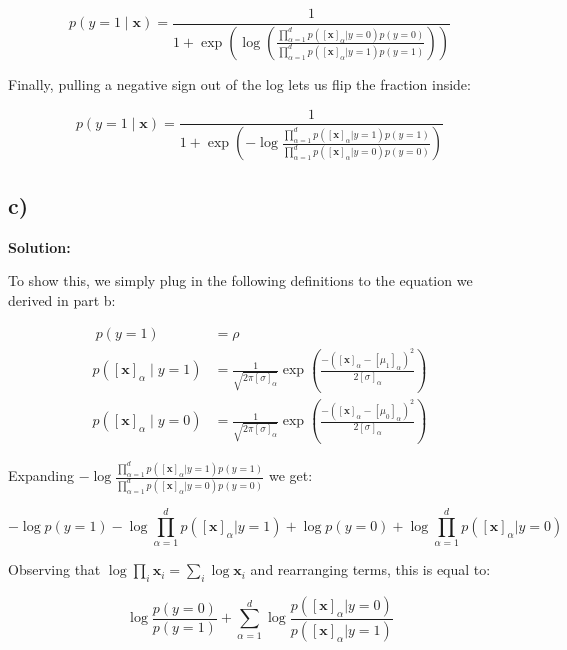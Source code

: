 \documentclass[11pt]{article}
\begin{document}
\begin{equation*}
	p(y=1 \mid \mathbf{x})=\frac{1}{1+\exp\left(\log\left(\frac{\prod_{\alpha=1}^{d} p([\mathbf{x}]_{\alpha}|y=0)p(y=0)}{\prod_{\alpha=1}^{d} p([\mathbf{x}]_{\alpha}|y=1)p(y=1)}\right)\right)}
\end{equation*}

Finally, pulling a negative sign out of the log lets us flip the fraction inside:

\begin{equation*}
p(y=1 \mid \mathbf{x}) = \frac{1}{1+\exp{\left(-\log\frac{\prod_{\alpha=1}^{d} p([\mathbf{x}]_{\alpha}|y=1)p(y=1)}{\prod_{\alpha=1}^{d} p([\mathbf{x}]_{\alpha}|y=0)p(y=0)}\right)}}
\end{equation*}

\subsection*{c)}


\textbf{Solution:}


To show this, we simply plug in the following definitions to the equation we derived in part b:

\begin{align*}\
p(y=1) &= \rho \\
p([\mathbf{x}]_{\alpha} \mid y=1)&=\frac{1}{\sqrt{2\pi[\sigma]_{\alpha}}}\exp\left(\frac{-([\mathbf{x}]_{\alpha}-[\mu_{1}]_{\alpha})^{2}}{2[\sigma]_{\alpha}}\right) \\
p([\mathbf{x}]_{\alpha} \mid y=0)&=\frac{1}{\sqrt{2\pi[\sigma]_{\alpha}}}\exp\left(\frac{-([\mathbf{x}]_{\alpha}-[\mu_{0}]_{\alpha})^{2}}{2[\sigma]_{\alpha}}\right)
\end{align*}

Expanding $-\log\frac{\prod_{\alpha=1}^{d} p([\mathbf{x}]_{\alpha}|y=1)p(y=1)}{\prod_{\alpha=1}^{d} p([\mathbf{x}]_{\alpha}|y=0)p(y=0)}$ we get:

\begin{equation*}
-\log p(y=1) - \log \prod_{\alpha=1}^{d} p([\mathbf{x}]_{\alpha}|y=1) + \log p(y=0) + \log \prod_{\alpha=1}^{d} p([\mathbf{x}]_{\alpha}|y=0)
\end{equation*}

Observing that $\log \prod_{i} \mathbf{x}_{i} = \sum_{i} \log \mathbf{x}_{i}$ and rearranging terms, this is equal to:

\begin{equation*}
\log \frac{p(y=0)}{p(y=1)} + \sum_{\alpha=1}^{d} \log \frac{p([\mathbf{x}]_{\alpha}|y=0)}{p([\mathbf{x}]_{\alpha}|y=1)}
\end{equation*}
\end{document}
